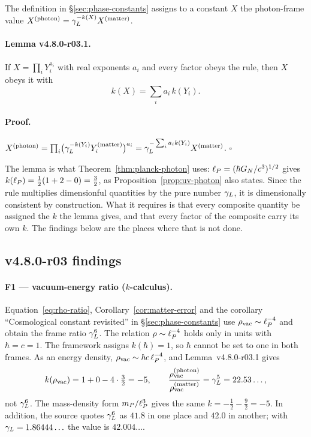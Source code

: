 The definition in \S\ref{sec:phase-constants} assigns to a constant \(X\) the photon-frame
value \(X^{(\mathrm{photon})}=\gamma_L^{-k(X)}X^{(\mathrm{matter})}\).

\paragraph{Lemma v4.8.0-r03.1.}
If \(X=\prod_i Y_i^{a_i}\) with real exponents \(a_i\) and every factor obeys the rule, then
\(X\) obeys it with
\[
k(X)=\sum_i a_i\,k(Y_i).
\]

\paragraph{Proof.}
\(X^{(\mathrm{photon})}=\prod_i\bigl(\gamma_L^{-k(Y_i)}Y_i^{(\mathrm{matter})}\bigr)^{a_i}
=\gamma_L^{-\sum_i a_ik(Y_i)}X^{(\mathrm{matter})}\).  \(\square\)

The lemma is what Theorem~\ref{thm:planck-photon} uses: \(\ell_P=(\hbar G_N/c^3)^{1/2}\) gives
\(k(\ell_P)=\tfrac12(1+2-0)=\tfrac32\), as Proposition~\ref{prop:uv-photon} also states.  Since
the rule multiplies dimensionful quantities by the pure number \(\gamma_L\), it is dimensionally
consistent by construction.  What it requires is that every composite quantity be assigned
the \(k\) the lemma gives, and that every factor of the composite carry its own \(k\).  The
findings below are the places where that is not done.

\subsection*{v4.8.0-r03 findings}
\label{subsec:v480-r03-findings}

\paragraph{F1 --- vacuum-energy ratio (\(k\)-calculus).}
Equation~\eqref{eq:rho-ratio}, Corollary~\ref{cor:matter-error} and the corollary
``Cosmological constant revisited'' in \S\ref{sec:phase-constants} use
\(\rho_{\mathrm{vac}}\sim\ell_P^{-4}\) and obtain the frame ratio \(\gamma_L^{6}\).  The relation
\(\rho\sim\ell_P^{-4}\) holds only in units with \(\hbar=c=1\).  The framework assigns
\(k(\hbar)=1\), so \(\hbar\) cannot be set to one in both frames.  As an energy density,
\(\rho_{\mathrm{vac}}\sim\hbar c\,\ell_P^{-4}\), and Lemma~v4.8.0-r03.1 gives
\[
k(\rho_{\mathrm{vac}})=1+0-4\cdot\tfrac32=-5,
\qquad
\frac{\rho_{\mathrm{vac}}^{(\mathrm{photon})}}{\rho_{\mathrm{vac}}^{(\mathrm{matter})}}=\gamma_L^{5}=22.53\ldots,
\]
not \(\gamma_L^{6}\).  The mass-density form \(m_P/\ell_P^{3}\) gives the same \(k=-\tfrac12-\tfrac92=-5\).
In addition, the source quotes \(\gamma_L^{6}\) as \(41.8\) in one place and \(42.0\) in another;
with \(\gamma_L=1.86444\ldots\) the value is \(42.004\ldots\).


